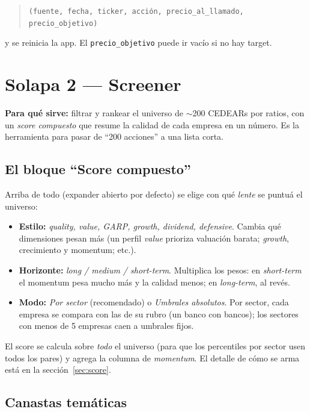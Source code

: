 \documentclass[11pt,a4paper]{article}
\newcommand{\code}[1]{\texttt{#1}}
\begin{document}
\begin{quote}
\code{(fuente, fecha, ticker, acci\'on, precio\_al\_llamado, precio\_objetivo)}
\end{quote}

\noindent y se reinicia la app. El \code{precio\_objetivo}
puede ir vac\'io si no hay target.

\section{Solapa 2 --- Screener}

\textbf{Para qu\'e sirve:} filtrar y rankear el universo de $\sim$200 CEDEARs por
ratios, con un \emph{score compuesto} que resume la calidad de cada empresa en un
n\'umero. Es la herramienta para pasar de ``200 acciones'' a una lista corta.

\subsection{El bloque ``Score compuesto''}

Arriba de todo (expander abierto por defecto) se elige con qu\'e \emph{lente} se
puntu\'a el universo:

\begin{itemize}[leftmargin=1.4em]
  \item \textbf{Estilo:} \emph{quality, value, GARP, growth, dividend, defensive}.
  Cambia qu\'e dimensiones pesan m\'as (un perfil \emph{value} prioriza valuaci\'on
  barata; \emph{growth}, crecimiento y momentum; etc.).
  \item \textbf{Horizonte:} \emph{long / medium / short-term}. Multiplica los pesos:
  en \emph{short-term} el momentum pesa mucho m\'as y la calidad menos; en
  \emph{long-term}, al rev\'es.
  \item \textbf{Modo:} \emph{Por sector} (recomendado) o \emph{Umbrales absolutos}.
  Por sector, cada empresa se compara con las de su rubro (un banco con bancos); los
  sectores con menos de 5 empresas caen a umbrales fijos.
\end{itemize}

El score se calcula sobre \emph{todo} el universo (para que los percentiles por sector
usen todos los pares) y agrega la columna de \emph{momentum}. El detalle de c\'omo se
arma est\'a en la secci\'on~\ref{sec:score}.

\subsection{Canastas tem\'aticas}
\end{document}
